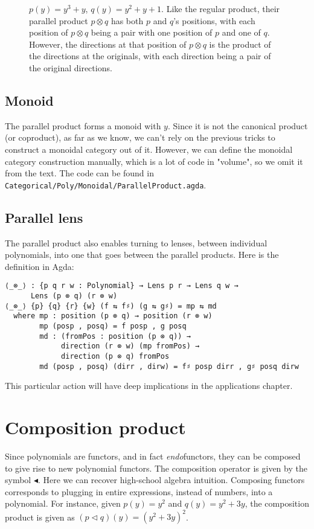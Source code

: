 \begin{figure}[H]
    \caption{$p(y) = y^3 + y$, $q(y) = y^2 + y + 1$. Like the regular product, their parallel product $p \otimes q$ has both $p$ and $q$'s positions, with each  position of $p \otimes q$ being a pair with one position of $p$ and one of $q$. However, the directions at that position of $p \otimes q$ is the product of the directions at the originals, with each direction being a pair of the original directions.}
    \label{fig:parallelProductExample}
\end{figure}


\subsection{Monoid}

The parallel product forms a monoid with $y$. Since it is not the canonical product (or coproduct), as far as we know, we can't rely on the previous tricks to construct a monoidal category out of it. However, we can define the monoidal category construction manually, which is a lot of code in "volume", so we omit it from the text. The code can be found in \texttt{Categorical/Poly/Monoidal/ParallelProduct.agda}.

\subsection{Parallel lens}

The parallel product also enables turning to lenses, between individual polynomials, into one that goes between the parallel products. Here is the definition in Agda:

\begin{verbatim}
⟨_⊗_⟩ : {p q r w : Polynomial} → Lens p r → Lens q w → 
      Lens (p ⊗ q) (r ⊗ w)
⟨_⊗_⟩ {p} {q} {r} {w} (f ⇆ f♯) (g ⇆ g♯) = mp ⇆ md
  where mp : position (p ⊗ q) → position (r ⊗ w)
        mp (posp , posq) = f posp , g posq
        md : (fromPos : position (p ⊗ q)) → 
             direction (r ⊗ w) (mp fromPos) → 
             direction (p ⊗ q) fromPos
        md (posp , posq) (dirr , dirw) = f♯ posp dirr , g♯ posq dirw
\end{verbatim}

This particular action will have deep implications in the applications chapter.

\section{Composition product}
Since polynomials are functors, and in fact \textit{endo}functors, they can be composed to give rise to new polynomial functors. The composition operator is given by the symbol ◂. Here we can recover high-school algebra intuition. Composing functors corresponds to plugging in entire expressions, instead of numbers, into a polynomial. For instance, given $p(y) = y^2$ and $q(y) = y^2 + 3y$, the composition product is given as $(p \triangleleft q)(y) = (y^2 + 3y)^2$.

